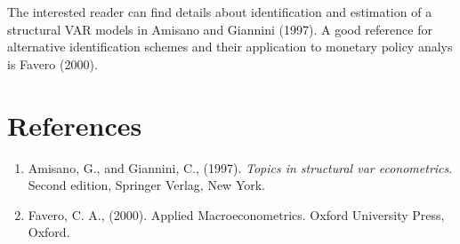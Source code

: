 \documentclass{article}
\begin{document}
The interested reader can find details about identification and estimation
of a structural VAR models in Amisano and Giannini (1997). A good reference
for alternative identification schemes and their application to monetary
policy analys is Favero (2000).

\section{References}
\begin{enumerate}
\item[]   Amisano, G., and Giannini, C., (1997). \textit{Topics in
structural var econometrics}. Second edition, Springer Verlag, New York.

\item[] Favero, C. A., (2000). Applied Macroeconometrics. Oxford
University Press, Oxford.

\end{enumerate}
\end{document}
